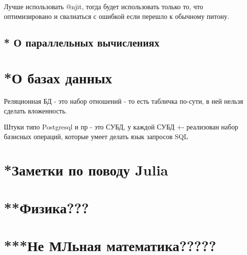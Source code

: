 \documentclass[11pt]{article}
\begin{document}
Лучше использовать @njit, тогда будет использовать только то, что оптимизировано и свалиаться с ошибкой если перешло к обычному питону.

\subsection{* О параллельных вычислениях}

\section{*О базах данных}

Реляционная БД - это набор отношений - то есть табличка по-сути, в ней нельзя сделать вложенность.

Штуки типо Postgresql и пр - это СУБД, у каждой СУБД +- реализован набор базисных операций, которые умеет делать язык запросов SQL

\section{*Заметки по поводу Julia}

\section{**Физика???}

\section{***Не МЛьная математика?????}
\end{document}
